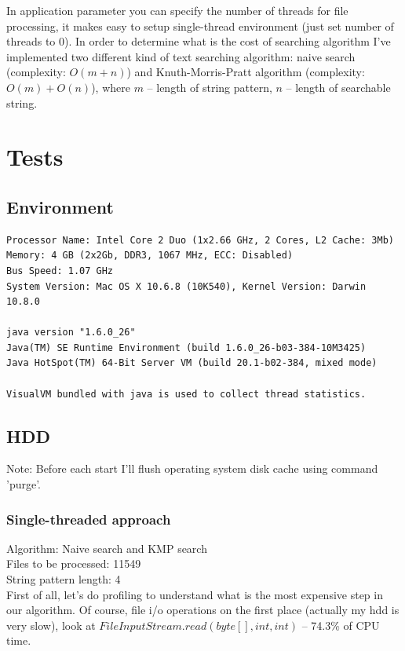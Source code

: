 \documentclass[a4paper,12pt,final]{article}
\begin{document}
In application parameter you can specify the number of threads for file processing, it makes easy to setup single-thread environment (just set number of threads to 0). In order to determine what is the cost of searching algorithm I've implemented two different kind of text searching algorithm: naive search (complexity: $O(m + n)$) and Knuth-Morris-Pratt algorithm (complexity: $O(m) + O(n)$), where $m$ -- length of string pattern, $n$ -- length of searchable string.
 
\section*{Tests}

\subsection*{Environment}

\begin{verbatim}
Processor Name: Intel Core 2 Duo (1x2.66 GHz, 2 Cores, L2 Cache: 3Mb)
Memory: 4 GB (2x2Gb, DDR3, 1067 MHz, ECC: Disabled)
Bus Speed: 1.07 GHz
System Version: Mac OS X 10.6.8 (10K540), Kernel Version: Darwin 10.8.0

java version "1.6.0_26"
Java(TM) SE Runtime Environment (build 1.6.0_26-b03-384-10M3425)
Java HotSpot(TM) 64-Bit Server VM (build 20.1-b02-384, mixed mode)

VisualVM bundled with java is used to collect thread statistics.
\end{verbatim}

\subsection*{HDD}

Note: Before each start I'll flush operating system disk cache using command 'purge'.

\subsubsection*{Single-threaded approach}
Algorithm: Naive search and KMP search\\
Files to be processed: 11549\\
String pattern length: 4\\

First of all, let's do profiling to understand what is the most expensive step in our algorithm. Of course, file i/o operations on the first place (actually my hdd is very slow), look at $FileInputStream.read(byte[],int,int)$ -- 74.3\% of CPU time.
\end{document}
